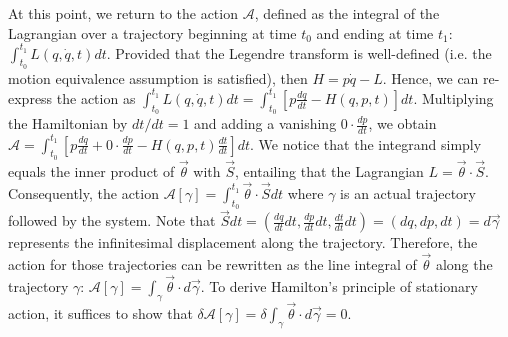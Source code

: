 \documentclass[letterpaper]{article}
\renewcommand{\vector}[1]{\ensuremath{\vec{#1}}} %
\newcommand{\integral}{\int}
\begin{document}

At this point, we return to the action $ \mathscr{A}$, defined as the integral of the Lagrangian over a trajectory beginning at time $t_0$ and ending at time $t_1$: $\integral^{t_1}_{t_0} L (q, \dot{q}, t) dt$. Provided that the Legendre transform is well-defined (i.e. the motion equivalence assumption is satisfied), then $H = p \dot{q} - L$. Hence, we can re-express the action as $\integral^{t_1}_{t_0} L (q, \dot{q}, t) dt = \integral^{t_1}_{t_0} [p \frac{dq}{dt} - H(q, p, t) ]dt$. Multiplying the Hamiltonian by $dt/dt = 1$ and adding a vanishing $0 \cdot \frac{dp}{dt}$, we obtain $ \mathscr{A} = \integral^{t_1}_{t_0} [p \frac{dq}{dt} + 0 \cdot \frac{dp}{dt} - H(q, p, t) \frac{dt}{dt} ]dt$. We notice that the integrand simply equals the inner product of $\vector{\theta}$ with $\vector{S} $, entailing that the Lagrangian $L =\vector{\theta} \cdot \vector{S} $. Consequently, the action $ \mathscr{A} [\gamma] = \integral^{t_1}_{t_0} \vector{\theta} \cdot \vector{S}  dt$ where $\gamma$ is an actual trajectory followed by the system. Note that $\vector{S}  dt = (\frac{d q }{d t } dt, \frac{d p }{d t } dt, \frac{d t }{d t }dt ) = (dq, dp, dt) = d\vector{\gamma}$ represents the infinitesimal displacement along the trajectory. Therefore, the action for those trajectories can be rewritten as the line integral of $\vector{\theta}$ along the trajectory $\gamma $: $ \mathscr{A} [\gamma] =\integral_{\gamma} \vector{\theta} \cdot d\vector{\gamma}$. To derive Hamilton's principle of stationary action, it suffices to show that $\delta \mathscr{A} [\gamma] =\delta \integral_{\gamma} \vector{\theta} \cdot d\vector{\gamma} = 0$. 
\end{document}
